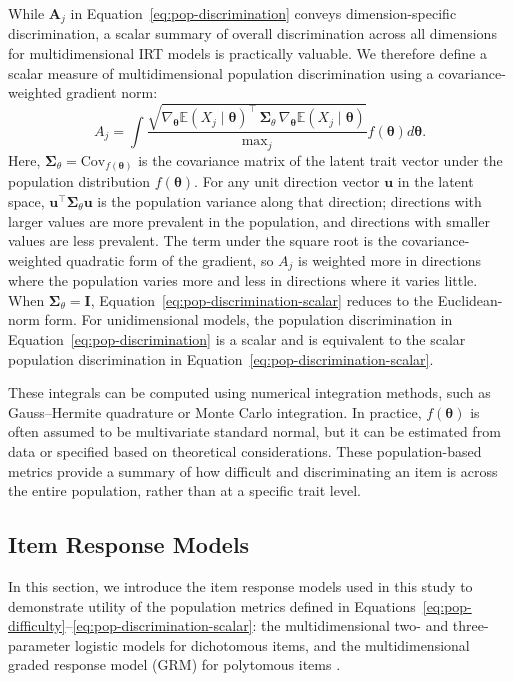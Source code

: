 \documentclass[man, 12pt, floatsintext]{apa7}
\begin{document}
While $\mathbf{A}_j$ in Equation~\eqref{eq:pop-discrimination} conveys dimension-specific discrimination, a scalar summary of overall discrimination across all dimensions for multidimensional IRT models is practically valuable. We therefore define a scalar measure of multidimensional population discrimination using a covariance-weighted gradient norm:
\begin{equation}\label{eq:pop-discrimination-scalar}
A_j = \int \frac{\sqrt{\nabla_{\boldsymbol{\theta}}\mathbb{E}(X_j \mid \boldsymbol{\theta})^{\top}\,\boldsymbol{\Sigma}_\theta\,\nabla_{\boldsymbol{\theta}}\mathbb{E}(X_j \mid \boldsymbol{\theta})}}{\mathrm{max}_j} f(\boldsymbol{\theta}) d\boldsymbol{\theta}.
\end{equation}
Here, $\boldsymbol{\Sigma}_\theta=\mathrm{Cov}_{f(\boldsymbol{\theta})}$ is the covariance matrix of the latent trait vector under the population distribution $f(\boldsymbol{\theta})$. For any unit direction vector $\mathbf{u}$ in the latent space, $\mathbf{u}^{\top}\boldsymbol{\Sigma}_\theta\mathbf{u}$ is the population variance along that direction; directions with larger values are more prevalent in the population, and directions with smaller values are less prevalent. The term under the square root is the covariance-weighted quadratic form of the gradient, so $A_j$ is weighted more in directions where the population varies more and less in directions where it varies little. When $\boldsymbol{\Sigma}_\theta=\mathbf{I}$, Equation~\eqref{eq:pop-discrimination-scalar} reduces to the Euclidean-norm form. For unidimensional models, the population discrimination in Equation~\eqref{eq:pop-discrimination} is a scalar and is equivalent to the scalar population discrimination in Equation~\eqref{eq:pop-discrimination-scalar}.

These integrals can be computed using numerical integration methods, such as Gauss–Hermite quadrature or Monte Carlo integration. In practice, $f(\boldsymbol{\theta})$ is often assumed to be multivariate standard normal, but it can be estimated from data or specified based on theoretical considerations. These population-based metrics provide a summary of how difficult and discriminating an item is across the entire population, rather than at a specific trait level.

\subsection{Item Response Models}
In this section, we introduce the item response models used in this study to demonstrate utility of the population metrics defined in Equations~\eqref{eq:pop-difficulty}--\eqref{eq:pop-discrimination-scalar}: the multidimensional two- and three-parameter logistic models for dichotomous items, and the multidimensional graded response model (GRM) for polytomous items \parencite{Reckase2009}.
\end{document}
